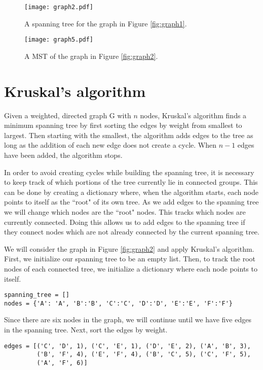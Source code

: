 \begin{figure}[H]
\texttt{[image: graph2.pdf]}
\caption{A spanning tree for the graph in Figure \ref{fig:graph1}.}
\label{fig:graph4}
\end{figure}

\begin{figure}[H]
\texttt{[image: graph5.pdf]}
\caption{A MST of the graph in Figure \ref{fig:graph2}.}
\label{fig:graph5}
\end{figure}

\section*{Kruskal's algorithm}

Given a weighted, directed graph G with $n$ nodes, Kruskal's algorithm finds a minimum spanning tree by first sorting the edges by weight from smallest to largest.
Then starting with the smallest, the algorithm adds edges to the tree as long as the addition of each new edge does not create a cycle.
When $n-1$ edges have been added, the algorithm stops.

In order to avoid creating cycles while building the spanning tree, it is necessary to keep track of which portions of the tree currently lie in connected groups.
This can be done by creating a dictionary where, when the algorithm starts, each node points to itself as the ``root" of its own tree.
As we add edges to the spanning tree we will change which nodes are the ``root" nodes. This tracks which nodes are currently connected.
Doing this allows us to add edges to the spanning tree if they connect nodes which are not already connected by the current spanning tree.

We will consider the graph in Figure \ref{fig:graph2} and apply Kruskal's algorithm.
First, we initialize our spanning tree to be an empty list. Then, to track the root nodes of each connected tree, we initialize a dictionary where each node points to itself.

\begin{lstlisting}
spanning_tree = []
nodes = {'A': 'A', 'B':'B', 'C':'C', 'D':'D', 'E':'E', 'F':'F'}
\end{lstlisting}
Since there are six nodes in the graph, we will continue until we have five edges in the spanning tree.
Next, sort the edges by weight.

\begin{lstlisting}
edges = [('C', 'D', 1), ('C', 'E', 1), ('D', 'E', 2), ('A', 'B', 3), 
	     ('B', 'F', 4), ('E', 'F', 4), ('B', 'C', 5), ('C', 'F', 5), 
	     ('A', 'F', 6)]
\end{lstlisting}

